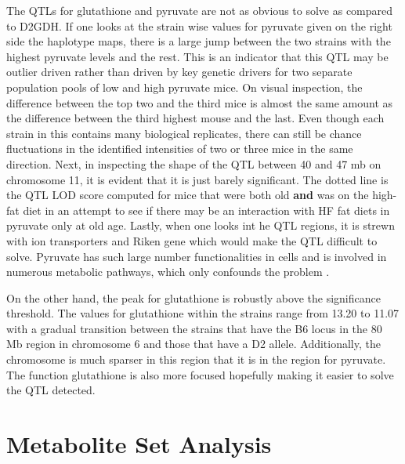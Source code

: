 \documentclass[a4paper,11pt,twoside]{book}
\begin{document}
    The QTLs for glutathione and pyruvate are not as obvious to solve as compared to D2GDH. If one looks at the strain wise values for pyruvate given on the right side the haplotype maps, there is a large jump between the two strains with the highest pyruvate levels and the rest. This is an indicator that this QTL may be outlier driven rather than driven by key genetic drivers for two separate population pools of low and high pyruvate mice. On visual inspection, the difference between the top two and the third mice is almost the same amount as the difference between the third highest mouse and the last. Even though each strain in this contains many biological replicates, there can still be chance fluctuations in the identified intensities of two or three mice in the same direction. Next, in inspecting the shape of the QTL between 40 and 47 mb on chromosome 11, it is evident that it is just barely significant. The dotted line is the QTL LOD score computed for mice that were both old \textbf{and} was on the high-fat diet in an attempt to see if there may be an interaction with HF fat diets in pyruvate only at old age. Lastly, when one looks int he QTL regions, it is strewn with ion transporters and Riken gene which would make the QTL difficult to solve. Pyruvate has such large number functionalities in cells and is involved in numerous metabolic pathways, which only confounds the problem \citep{Voet2011Biochemistry}.
	
    On the other hand, the peak for glutathione is robustly above the significance threshold. The values for glutathione within the strains range from 13.20 to 11.07 with a gradual transition between the strains that have the B6 locus in the 80 Mb region in chromosome 6 and those that have a D2 allele. Additionally, the chromosome is much sparser in this region that it is in the region for pyruvate. The function glutathione is also more focused hopefully making it easier to solve the QTL detected.

	
	\section{Metabolite Set Analysis}
	
\end{document}
